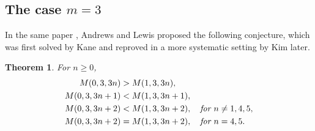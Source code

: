 \documentclass[12pt]{amsart}
\numberwithin{equation}{section}
\theoremstyle{plain}
\newtheorem{theorem}{Theorem}[section]
\theoremstyle{definition}
\begin{document}
\subsection{The case $m=3$}
In the same paper \cite{AL}, Andrews and Lewis proposed the following conjecture, which was first solved by Kane \cite{Kan} and reproved in a more systematic setting by Kim \cite{Kim} later.
\begin{theorem}\label{Kane thm}
For $n\geq0$,
\begin{align*}
M(0,3,3n) &>M(1,3,3n),\\
M(0,3,3n+1) &<M(1,3,3n+1),\\
M(0,3,3n+2) &<M(1,3,3n+2),\quad \emph{for }n\neq1,4,5,\\
M(0,3,3n+2) &=M(1,3,3n+2),\quad \emph{for }n=4,5.
\end{align*}
\end{theorem}
\end{document}
